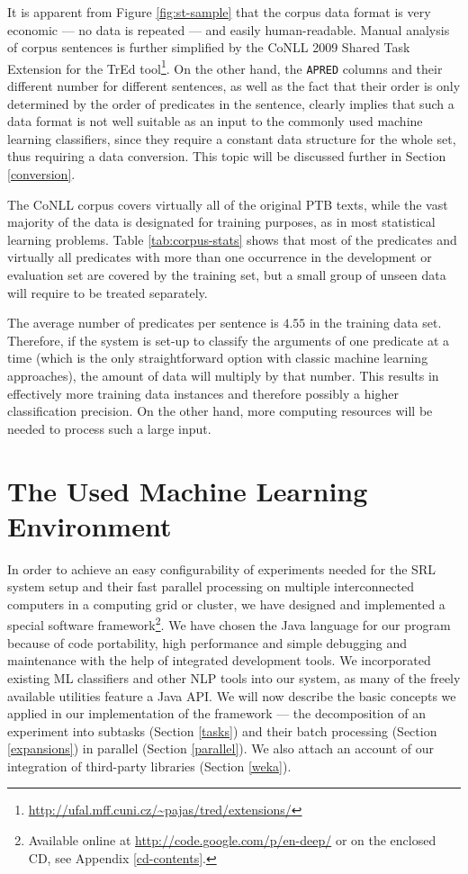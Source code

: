 \documentclass[12pt,notitlepage,a4paper]{report}
\begin{document}
It is apparent from Figure \ref{fig:st-sample} that the corpus data format is very economic --- no data is repeated --- and easily human-readable. Manual analysis of corpus sentences is further simplified by the CoNLL 2009 Shared Task Extension for the TrEd tool\footnote{\url{http://ufal.mff.cuni.cz/\~pajas/tred/extensions/}}. On the other hand, the \texttt{APRED} columns and their different number for different sentences, as well as the fact that their order is only determined by the order of predicates in the sentence, clearly implies that such a data format is not well suitable as an input to the commonly used machine learning classifiers, since they require a constant data structure for the whole set, thus requiring a data conversion. This topic will be discussed further in Section \ref{conversion}.

The CoNLL corpus covers virtually all of the original PTB texts, while the vast majority of the data is designated for training purposes, as in most statistical learning problems. Table \ref{tab:corpus-stats} shows that most of the predicates and virtually all predicates with more than one occurrence in the development or evaluation set are covered by the training set, but a small group of unseen data will require to be treated separately.

The average number of predicates per sentence is $4.55$ in the training data set. Therefore, if the system is set-up to classify the arguments of one predicate at a time (which is the only straightforward option with classic machine learning approaches), the amount of data will multiply by that number. This results in effectively more training data instances and therefore possibly a higher classification precision. On the other hand, more computing resources will be needed to process such a large input.

%
%
\chapter{The Used Machine Learning Environment}\label{mlprocess}
%
%

In order to achieve an easy configurability of experiments needed for the SRL system setup and their fast parallel processing on multiple interconnected computers in a computing grid or cluster, we have designed and implemented a special software framework\footnote{Available online at \url{http://code.google.com/p/en-deep/} or on the enclosed CD, see Appendix \ref{cd-contents}.}. We have chosen the Java language for our program because of code portability, high performance and simple debugging and maintenance with the help of integrated development tools. We incorporated existing ML classifiers and other NLP tools into our system, as many of the freely available utilities feature a Java API. We will now describe the basic concepts we applied in our implementation of the framework --- the decomposition of an experiment into subtasks (Section \ref{tasks}) and their batch processing (Section \ref{expansions}) in parallel (Section \ref{parallel}). We also attach an account of our integration of third-party libraries (Section \ref{weka}).
\end{document}
